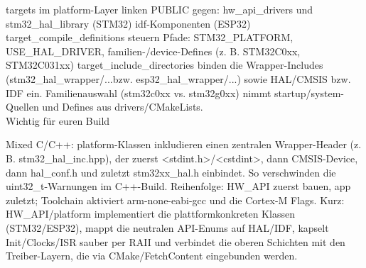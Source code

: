 targets im platform-Layer linken PUBLIC gegen:
hw\_api\_drivers und stm32\_hal\_library (STM32)
idf-Komponenten (ESP32)
target\_compile\_definitions steuern Pfade:
STM32\_PLATFORM, USE\_HAL\_DRIVER, familien-/device-Defines (z. B. STM32C0xx, STM32C031xx)
target\_include\_directories binden die Wrapper-Includes (stm32\_hal\_wrapper/...bzw. esp32\_hal\_wrapper/...) sowie HAL/CMSIS bzw. IDF ein.
Familienauswahl (stm32c0xx vs. stm32g0xx) nimmt startup/system-Quellen und Defines aus drivers/CMakeLists.
\\
Wichtig für euren Build

Mixed C/C++: platform-Klassen inkludieren einen zentralen Wrapper-Header (z. B. stm32\_hal\_inc.hpp), der zuerst <stdint.h>/<cstdint>, dann CMSIS-Device, dann hal\_conf.h und zuletzt stm32xx\_hal.h einbindet. So verschwinden die uint32\_t-Warnungen im C++-Build.
Reihenfolge: HW\_API zuerst bauen, app zuletzt; Toolchain aktiviert arm-none-eabi-gcc und die Cortex-M Flags.
Kurz: HW\_API/platform implementiert die plattformkonkreten Klassen (STM32/ESP32), mappt die neutralen API-Enums auf HAL/IDF, kapselt Init/Clocks/ISR sauber per RAII und verbindet die oberen Schichten mit den Treiber-Layern, die via CMake/FetchContent eingebunden werden.
















































